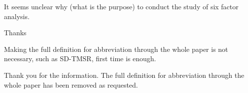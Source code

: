 \documentclass[answers,11pt]{exam}
\begin{document}
\begin{questions}
        \question It seems unclear why (what is the purpose) to conduct the study of six factor analysis.
        \begin{solution}
                 Thanks  
        \end{solution}

        \question Making the full definition for abbreviation through the whole paper is not necessary, such as SD-TMSR, first time is enough.
        
        \begin{solution}
                Thank you for the information. The full definition for abbreviation through the whole paper has been removed as requested.
        \end{solution}


        
        
\end{questions}


\end{document}
